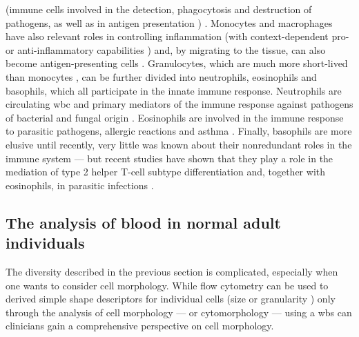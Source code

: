 (immune cells involved in the detection, phagocytosis and destruction of pathogens, as well as in antigen presentation \cite{Mills2012-rc}) \cite{Jakubzick2017-is}. Monocytes and macrophages have also relevant roles in controlling inflammation (with context-dependent pro- or anti-inflammatory capabilities \cite{Rivollier2012-we,Bain2013-qe}) and, by migrating to the tissue, can also become antigen-presenting cells \cite{Jakubzick2013-az,Plantinga2013-kn}. Granulocytes, which are much more short-lived than monocytes \cite{Athens1961-cl}, can be further divided into neutrophils, eosinophils and basophils, which all participate in the innate immune response. Neutrophils are circulating \ac{wbc} and primary mediators of the immune response against pathogens of bacterial and fungal origin \cite{Malech2014-dm}. Eosinophils are involved in the immune response to parasitic pathogens, allergic reactions and asthma \cite{Uhm2012-ja,Huang2016-br}. Finally, basophils are more elusive until recently, very little was known about their nonredundant roles in the immune system \cite{Miyake2017-rh,Karasuyama2011-ws} --- but recent studies have shown that they play a role in the mediation of type 2 helper T-cell subtype differentiation \cite{Hida2005-lj,Oh2007-yr} and, together with eosinophils, in parasitic infections \cite{Karasuyama2011-ws,Huang2016-br}.

\begin{figure}
  \label{fig:haema}
\end{figure}

\subsection{The analysis of blood in normal adult individuals}

The diversity described in the previous section is complicated, especially when one wants to consider cell morphology. While flow cytometry can be used to derived simple shape descriptors for individual cells (size or granularity \cite{Shapiro2005-ud}) only through the analysis of cell morphology --- or cytomorphology --- using a \ac{wbs} can clinicians gain a comprehensive perspective on cell morphology.


